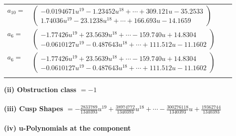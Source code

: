 \documentclass[1p]{elsarticle_modified}
\theoremstyle{definition}
\begin{document}
\begin{tabular}{m{7pt} m{180pt} m{7pt} m{180pt} }
\flushright $a_{10}=$&$\begin{pmatrix}-0.0194671 u^{19}-1.23452 u^{18}+\cdots+309.121 u-35.2533\\1.74036 u^{19}-23.1238 u^{18}+\cdots+166.693 u-14.1659\end{pmatrix}$ \\
\flushright $a_{6}=$&$\begin{pmatrix}-1.77426 u^{19}+23.5639 u^{18}+\cdots-159.740 u+14.8304\\-0.0610127 u^{19}-0.487643 u^{18}+\cdots+111.512 u-11.1602\end{pmatrix}$\\ \flushright $a_{6}=$&$\begin{pmatrix}-1.77426 u^{19}+23.5639 u^{18}+\cdots-159.740 u+14.8304\\-0.0610127 u^{19}-0.487643 u^{18}+\cdots+111.512 u-11.1602\end{pmatrix}$\\&\end{tabular}
\flushleft \textbf{(ii) Obstruction class $= -1$}\\~\\
\flushleft \textbf{(iii) Cusp Shapes $= -\frac{2833789}{1340393} u^{19}+\frac{38974772}{1340393} u^{18}+\cdots-\frac{300276118}{1340393} u+\frac{19362744}{1340393}$}\\~\\
\newpage\renewcommand{\arraystretch}{1}
\flushleft \textbf{(iv) u-Polynomials at the component}\newline \\
\end{document}

